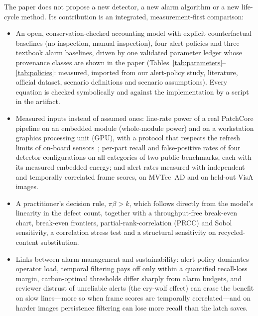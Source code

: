 The paper does not propose a new detector, a new alarm algorithm or a new life-cycle method. Its contribution is an integrated, measurement-first comparison:
\begin{itemize}
\item An open, conservation-checked accounting model with explicit counterfactual baselines (no inspection, manual inspection), four alert policies and three textbook alarm baselines, driven by one validated parameter ledger whose provenance classes are shown in the paper (Tables~\ref{tab:parameters}--\ref{tab:policies}: \RegistryMeasuredCount{} measured, \RegistryPaperACount{} imported from our alert-policy study, \RegistryLiteratureCount{} literature, \RegistryOfficialCount{} official dataset, \RegistryDefinitionCount{} scenario definitions and \RegistryAssumptionCount{} scenario assumptions). Every equation is checked symbolically and against the implementation by a script in the artifact.
\item Measured inputs instead of assumed ones: line-rate power of a real PatchCore pipeline on an embedded module (whole-module power) and on a workstation graphics processing unit (GPU), with a protocol that respects the refresh limits of on-board sensors~\cite{yang2024accurate}; per-part recall and false-positive rates of four detector configurations on all \DetCategories{} categories of two public benchmarks, each with its measured embedded energy; and alert rates measured with independent and temporally correlated frame scores, on MVTec~AD and on held-out VisA images.
\item A practitioner's decision rule, $\pi\beta>k$, which follows directly from the model's linearity in the defect count, together with a throughput-free break-even chart, break-even frontiers, partial-rank-correlation (PRCC) and Sobol sensitivity, a correlation stress test and a structural sensitivity on recycled-content substitution.
\item Links between alarm management and sustainability: alert policy dominates operator load, temporal filtering pays off only within a quantified recall-loss margin, carbon-optimal thresholds differ sharply from alarm budgets, and reviewer distrust of unreliable alerts (the cry-wolf effect) can erase the benefit on slow lines---more so when frame scores are temporally correlated---and on harder images persistence filtering can lose more recall than the latch saves.
\end{itemize}

